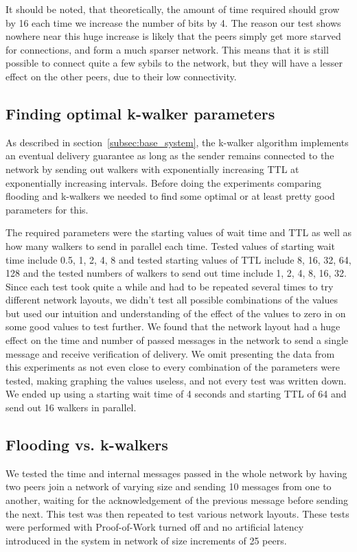 It should be noted, that theoretically, the amount of time required should grow by 16 each time we increase the number of bits by 4. The reason our test shows nowhere near this huge increase is likely that the peers simply get more starved for connections, and form a much sparser network. This means that it is still possible to connect quite a few sybils to the network, but they will have a lesser effect on the other peers, due to their low connectivity.

\subsection{Finding optimal k-walker parameters}
\label{subsec:k_opti_params}
As described in section~\ref{subsec:base_system}, the k-walker algorithm implements an eventual delivery guarantee as long as the sender remains connected to the network by sending out walkers with exponentially increasing TTL at exponentially increasing intervals. Before doing the experiments comparing flooding and k-walkers we needed to find some optimal or at least pretty good parameters for this.

The required parameters were the starting values of wait time and TTL as well as how many walkers to send in parallel each time. Tested values of starting wait time include 0.5, 1, 2, 4, 8 and tested starting values of TTL include 8, 16, 32, 64, 128 and the tested numbers of walkers to send out time include 1, 2, 4, 8, 16, 32. Since each test took quite a while and had to be repeated several times to try different network layouts, we didn't test all possible combinations of the values but used our intuition and understanding of the effect of the values to zero in on some good values to test further. We found that the network layout had a huge effect on the time and number of passed messages in the network to send a single message and receive verification of delivery. We omit presenting the data from this experiments as not even close to every combination of the parameters were tested, making graphing the values useless, and not every test was written down. We ended up using a starting wait time of 4 seconds and starting TTL of 64 and send out 16 walkers in parallel.

\subsection{Flooding vs. k-walkers}
We tested the time and internal messages passed in the whole network by having two peers join a network of varying size and sending 10 messages from one to another, waiting for the acknowledgement of the previous message before sending the next. This test was then repeated to test various network layouts. These tests were performed with Proof-of-Work turned off and no artificial latency introduced in the system in network of size increments of 25 peers.

